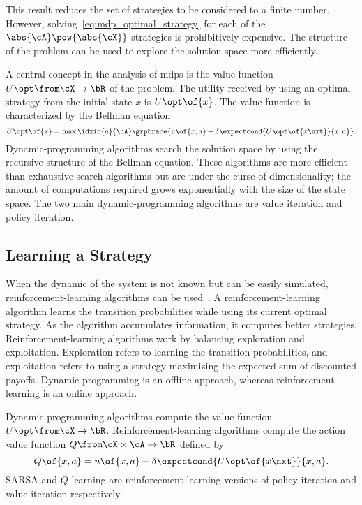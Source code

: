 This result reduces the set of strategies to be considered to a finite number.
However, solving~\cref{eq:mdp_optimal_strategy} for each of the \(\abs{\cA} \pow {\abs{\cX}}\) strategies is prohibitively expensive.
The structure of the problem can be used to explore the solution space more efficiently.

A central concept in the analysis of \acp{mdp} is the value function \(U\opt \from \cX \to \bR\) of the problem.
The utility received by using an optimal strategy from the initial state \(x\) is \(U\opt \of {x}\).
The value function is characterized by the Bellman equation
\begin{equation}
\label{eq:bellman_equation}
U\opt \of {x} = \max \idxin{a}{\cA} \grpbrace{u \of {x, a} + \delta \expectcond {U\opt \of{x\nxt}} {x, a}}.
\end{equation}
Dynamic-programming algorithms search the solution space by using the recursive structure of the Bellman equation.
These algorithms are more efficient than exhaustive-search algorithms but are under the curse of dimensionality; the amount of computations required grows exponentially with the size of the state space.
The two main dynamic-programming algorithms are value iteration and policy iteration.

\subsection{Learning a Strategy}
When the dynamic of the system is not known but can be easily simulated, reinforcement-learning algorithms can be used~\cite{bertsekas_tsitsiklis:1996, sutton_barto:1998}.
A reinforcement-learning algorithm learns the transition probabilities while using its current optimal strategy.
As the algorithm accumulates information, it computes better strategies.
Reinforcement-learning algorithms work by balancing exploration and exploitation.
Exploration refers to learning the transition probabilities, and exploitation refers to using a strategy maximizing the expected sum of discounted payoffs.
Dynamic programming is an offline approach, whereas reinforcement learning is an online approach.

Dynamic-programming algorithms compute the value function \(U\opt \from \cX \to \bR\).
Reinforcement-learning algorithms compute the action value function \(Q \from \cX \times \cA \to \bR\) defined by
\begin{equation}
\label{eq:q-value_definition}
Q \of {x, a} = u \of {x, a} + \delta \expectcond {U\opt \of{x\nxt}} {x, a}.
\end{equation}
SARSA and \(Q\)-learning are reinforcement-learning versions of policy iteration and value iteration respectively.

